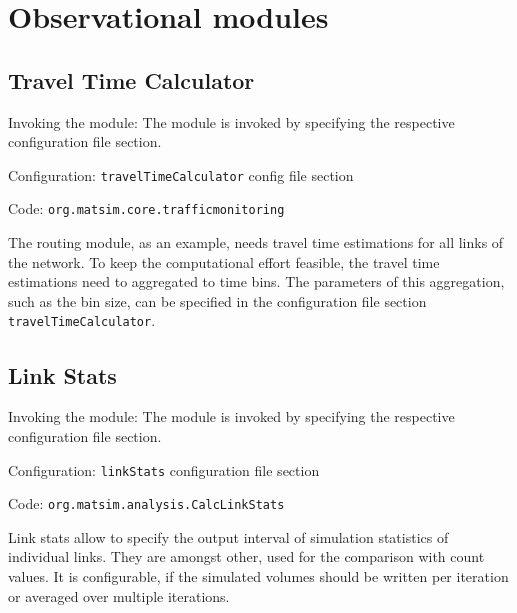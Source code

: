 \section{Observational modules}
\label{sec:observational}

\subsection{Travel Time Calculator}
\label{sec:ttc}
\begin{compactitem}
\item Invoking the module: The module is invoked by specifying the respective configuration file section.
\item Configuration: \lstinline|travelTimeCalculator| config file section
\item Code: \lstinline|org.matsim.core.trafficmonitoring|
\end{compactitem}

The routing module, as an example, needs travel time estimations for all links of the network. To keep the computational effort feasible, the travel time estimations need to aggregated to time bins. The parameters of this aggregation, such as the bin size, can be specified in the configuration file section \lstinline|travelTimeCalculator|.

\subsection{Link Stats}
\label{sec:linkStats}
\begin{compactitem}
\item Invoking the module: The module is invoked by specifying the respective configuration file section.
\item Configuration: \lstinline|linkStats| configuration file section
\item Code: \lstinline|org.matsim.analysis.CalcLinkStats|
\end{compactitem}

Link stats allow to specify the output interval of simulation statistics of individual links. They are amongst other, used for the comparison with count values. It is configurable, if the simulated volumes should be written per iteration or averaged over multiple iterations.



